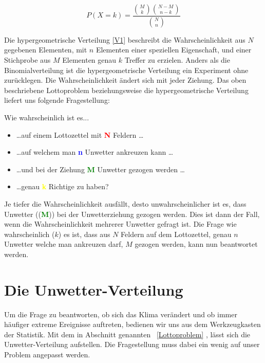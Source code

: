 \begin{refsection}
\begin{equation}
P(X = k) = 
\frac{\displaystyle \binom{M}{k} \binom{N-M}{n-k}}{\displaystyle \binom{N}{n} } 
\label {V1}
\end{equation}

Die hypergeometrische Verteilung \eqref{V1} beschreibt die Wahrscheinlichkeit aus $N$ gegebenen Elementen, mit $n$ Elementen einer speziellen Eigenschaft, und einer Stichprobe aus $M$ Elementen genau $k$ Treffer zu erzielen. 
Anders als die Binomialverteilung ist die hypergeometrische Verteilung ein Experiment ohne zurücklegen. Die Wahrscheinlichkeit ändert sich mit jeder Ziehung. 
%
Das oben beschriebene Lottoproblem beziehungsweise die hypergeometrische Verteilung liefert uns folgende Fragestellung:

Wie wahrscheinlich ist es...

\begin{itemize}
\item \dots auf einem Lottozettel mit \textcolor{red}{\textbf{N}} Feldern \dots
\item \dots auf welchem man \textcolor{blue}{\textbf{n}} Unwetter ankreuzen kann \dots
\item \dots und bei der Ziehung \textcolor{green}{\textbf{M}} Unwetter gezogen werden \dots
\item \dots genau \textcolor{yellow}{\textbf{k}} Richtige zu haben?
\end{itemize}

Je tiefer die Wahrscheinlichkeit ausfällt, desto unwahrscheinlicher ist es, dass Unwetter ((\textcolor{green}{\textbf{M}})) bei der Unwetterziehung gezogen werden. Dies ist dann der Fall, wenn die Wahrscheinlichkeit mehrerer Unwetter gefragt ist. Die Frage wie wahrscheinlich ($k$) es ist, dass aus $N$ Feldern auf dem Lottozettel, genau $n$ Unwetter welche man ankreuzen darf, $M$ gezogen werden, kann nun beantwortet werden.


\section{Die Unwetter-Verteilung} \label{UnwetterVert}
Um die Frage zu beantworten, ob sich das Klima verändert und ob immer häufiger extreme Ereignisse auftreten, bedienen wir uns aus dem Werkzeugkasten der Statistik. Mit dem in Abschnitt genannten ~\ref{Lottoproblem} , lässt sich die Unwetter-Verteilung aufstellen. Die Fragestellung muss dabei ein wenig auf unser Problem angepasst werden.


\end{refsection}
